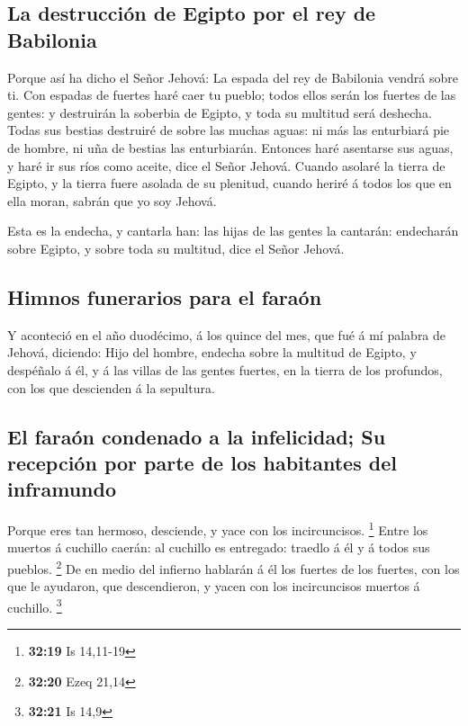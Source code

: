 \hypertarget{la-destrucciuxf3n-de-egipto-por-el-rey-de-babilonia}{%
\subsection{La destrucción de Egipto por el rey de
Babilonia}\label{la-destrucciuxf3n-de-egipto-por-el-rey-de-babilonia}}

 Porque así ha dicho el Señor Jehová: La espada del rey de
Babilonia vendrá sobre ti.  Con espadas de fuertes haré
caer tu pueblo; todos ellos serán los fuertes de las gentes: y
destruirán la soberbia de Egipto, y toda su multitud será deshecha.
 Todas sus bestias destruiré de sobre las muchas aguas: ni
más las enturbiará pie de hombre, ni uña de bestias las enturbiarán.
 Entonces haré asentarse sus aguas, y haré ir sus ríos como
aceite, dice el Señor Jehová.  Cuando asolaré la tierra de
Egipto, y la tierra fuere asolada de su plenitud, cuando heriré á todos
los que en ella moran, sabrán que yo soy Jehová.

 Esta es la endecha, y cantarla han: las hijas de las
gentes la cantarán: endecharán sobre Egipto, y sobre toda su multitud,
dice el Señor Jehová.

\hypertarget{himnos-funerarios-para-el-farauxf3n}{%
\subsection{Himnos funerarios para el
faraón}\label{himnos-funerarios-para-el-farauxf3n}}

 Y aconteció en el año duodécimo, á los quince del mes, que
fué á mí palabra de Jehová, diciendo:  Hijo del hombre,
endecha sobre la multitud de Egipto, y despéñalo á él, y á las villas de
las gentes fuertes, en la tierra de los profundos, con los que
descienden á la sepultura.

\hypertarget{el-farauxf3n-condenado-a-la-infelicidad-su-recepciuxf3n-por-parte-de-los-habitantes-del-inframundo}{%
\subsection{El faraón condenado a la infelicidad; Su recepción por parte
de los habitantes del
inframundo}\label{el-farauxf3n-condenado-a-la-infelicidad-su-recepciuxf3n-por-parte-de-los-habitantes-del-inframundo}}

 Porque eres tan hermoso, desciende, y yace con los
incircuncisos. \footnote{\textbf{32:19} Is 14,11-19}  Entre
los muertos á cuchillo caerán: al cuchillo es entregado: traedlo á él y
á todos sus pueblos. \footnote{\textbf{32:20} Ezeq 21,14} 
De en medio del infierno hablarán á él los fuertes de los fuertes, con
los que le ayudaron, que descendieron, y yacen con los incircuncisos
muertos á cuchillo. \footnote{\textbf{32:21} Is 14,9}

